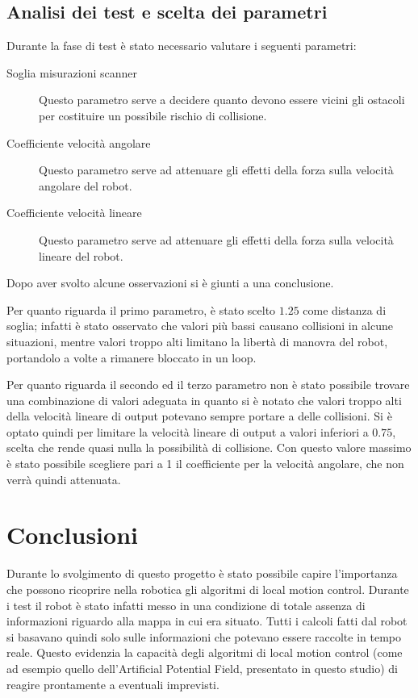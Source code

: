\documentclass[Lau, binding=0.6cm, oneside]{sapthesis}
\begin{document}
\section{Analisi dei test e scelta dei parametri}
Durante la fase di test è stato necessario valutare i seguenti parametri:
\begin{description}
    \item[Soglia misurazioni scanner] Questo parametro serve a decidere quanto devono essere vicini gli ostacoli per costituire un possibile rischio di collisione.
    \item[Coefficiente velocità angolare] Questo parametro serve ad attenuare gli effetti della forza sulla velocità angolare del robot.
    \item[Coefficiente velocità lineare] Questo parametro serve ad attenuare gli effetti della forza sulla velocità lineare del robot.
\end{description}
Dopo aver svolto alcune osservazioni si è giunti a una conclusione.

Per quanto riguarda il primo parametro, è stato scelto $1.25$ come distanza di soglia; infatti è stato osservato che valori più bassi causano collisioni in alcune situazioni, mentre valori troppo alti limitano la libertà di manovra del robot, portandolo a volte a rimanere bloccato in un loop.

Per quanto riguarda il secondo ed il terzo parametro non è stato possibile trovare una combinazione di valori adeguata in quanto si è notato che valori troppo alti della velocità lineare di output potevano sempre portare a delle collisioni.
Si è optato quindi per limitare la velocità lineare di output a valori inferiori a $0.75$, scelta che rende quasi nulla la possibilità di collisione.
Con questo valore massimo è stato possibile scegliere pari a 1 il coefficiente per la velocità angolare, che non verrà quindi attenuata.

\chapter{Conclusioni}
Durante lo svolgimento di questo progetto è stato possibile capire l'importanza che possono ricoprire nella robotica gli algoritmi di local motion control.
Durante i test il robot è stato infatti messo in una condizione di totale assenza di informazioni riguardo alla mappa in cui era situato.
Tutti i calcoli fatti dal robot si basavano quindi solo sulle informazioni che potevano essere raccolte in tempo reale.
Questo evidenzia la capacità degli algoritmi di local motion control (come ad esempio quello dell'Artificial Potential Field, presentato in questo studio) di reagire prontamente a eventuali imprevisti.
\end{document}
